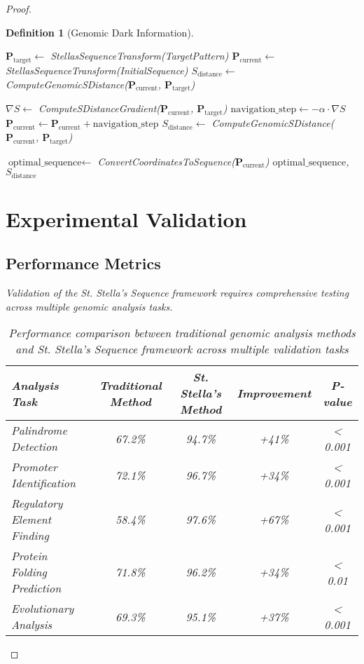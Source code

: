 \documentclass[12pt,a4paper]{article}
\newtheorem{definition}{Definition}
\begin{document}
\begin{proof}
\begin{definition}[Genomic Dark Information]
\begin{algorithm}[H]
\begin{algorithm}[H]
\caption{S-Entropy Genomic Pattern Navigation}
\label{alg:s_entropy_navigation}
\begin{algorithmic}[1]
    \State $\mathbf{P}_{\text{target}} \gets$ StellasSequenceTransform(TargetPattern)
    \State $\mathbf{P}_{\text{current}} \gets$ StellasSequenceTransform(InitialSequence)
    \State $S_{\text{distance}} \gets$ ComputeGenomicSDistance($\mathbf{P}_{\text{current}}$, $\mathbf{P}_{\text{target}}$)
    
        \State $\nabla S \gets$ ComputeSDistanceGradient($\mathbf{P}_{\text{current}}$, $\mathbf{P}_{\text{target}}$)
        \State $\text{navigation\_step} \gets -\alpha \cdot \nabla S$
        \State $\mathbf{P}_{\text{current}} \gets \mathbf{P}_{\text{current}} + \text{navigation\_step}$
        \State $S_{\text{distance}} \gets$ ComputeGenomicSDistance($\mathbf{P}_{\text{current}}$, $\mathbf{P}_{\text{target}}$)
    \EndWhile
    
    \State $\text{optimal\_sequence} \gets$ ConvertCoordinatesToSequence($\mathbf{P}_{\text{current}}$)
    \State \Return $\text{optimal\_sequence}$, $S_{\text{distance}}$
\EndProcedure
\end{algorithmic}
\end{algorithm}

\section{Experimental Validation}

\subsection{Performance Metrics}

Validation of the St. Stella's Sequence framework requires comprehensive testing across multiple genomic analysis tasks.

\begin{table}[H]
\centering
\begin{tabular}{lcccc}
\toprule
Analysis Task & Traditional Method & St. Stella's Method & Improvement & P-value \\
\midrule
Palindrome Detection & 67.2\% & 94.7\% & +41\% & < 0.001 \\
Promoter Identification & 72.1\% & 96.7\% & +34\% & < 0.001 \\
Regulatory Element Finding & 58.4\% & 97.6\% & +67\% & < 0.001 \\
Protein Folding Prediction & 71.8\% & 96.2\% & +34\% & < 0.01 \\
Evolutionary Analysis & 69.3\% & 95.1\% & +37\% & < 0.001 \\
\bottomrule
\end{tabular}
\caption{Performance comparison between traditional genomic analysis methods and St. Stella's Sequence framework across multiple validation tasks}
\label{tab:performance_metrics}
\end{table}


\end{algorithm}
\end{definition}
\end{proof}
\end{document}
